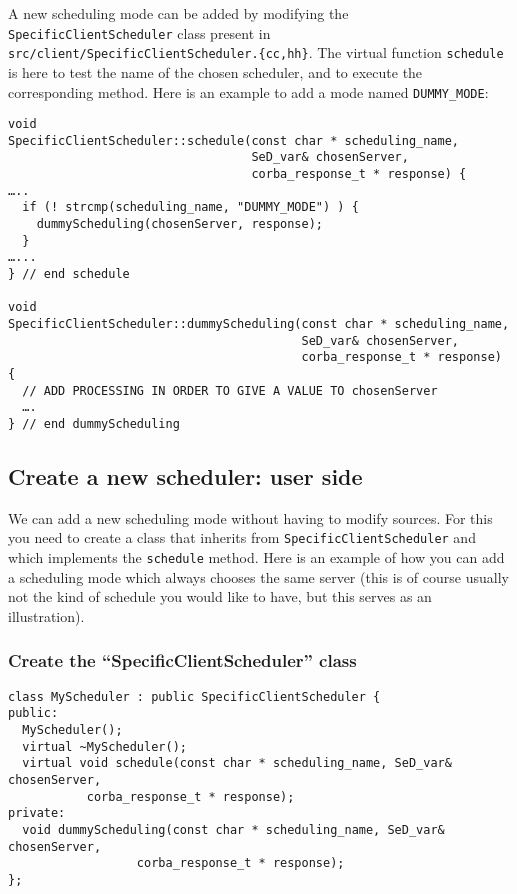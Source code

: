 A new scheduling mode can be added by modifying the
\texttt{SpecificClientScheduler} class present in
\texttt{src/client/SpecificClientScheduler.\{cc,hh\}}.
The virtual function \texttt{schedule} is here to test the name of the
chosen scheduler, and to execute the corresponding method.
Here is an example to add a mode named \texttt{DUMMY\_MODE}:
\begin{verbatim}
void
SpecificClientScheduler::schedule(const char * scheduling_name,
                                  SeD_var& chosenServer,
                                  corba_response_t * response) {
…..
  if (! strcmp(scheduling_name, "DUMMY_MODE") ) {
    dummyScheduling(chosenServer, response);
  }
…...
} // end schedule

void
SpecificClientScheduler::dummyScheduling(const char * scheduling_name,
                                         SeD_var& chosenServer,
                                         corba_response_t * response) {
  // ADD PROCESSING IN ORDER TO GIVE A VALUE TO chosenServer
  ….
} // end dummyScheduling
\end{verbatim}


\subsection{Create a new scheduler: user side}

We can add a new scheduling mode without having to modify \diet
sources. For this you need to create a class that inherits from
\texttt{SpecificClientScheduler} and which implements the
\texttt{schedule} method. Here is an example of how you can add a
scheduling mode which always chooses the same server (this is of
course usually not the kind of schedule you would like to have, but
this serves as an illustration).

\subsubsection{Create the ``SpecificClientScheduler'' class}

\begin{verbatim}
class MyScheduler : public SpecificClientScheduler {
public:
  MyScheduler();
  virtual ~MyScheduler();
  virtual void schedule(const char * scheduling_name, SeD_var& chosenServer,
           corba_response_t * response);
private:
  void dummyScheduling(const char * scheduling_name, SeD_var& chosenServer,
                  corba_response_t * response);
};
\end{verbatim}

